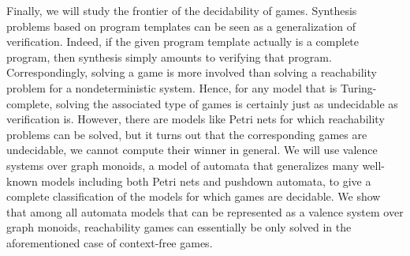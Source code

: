 \documentclass[../../diss.tex]{subfiles}
\begin{document}
Finally, we will study the frontier of the decidability of games.
Synthesis problems based on program templates can be seen as a generalization of verification.
Indeed, if the given program template actually is a complete program, then synthesis simply amounts to verifying that program.
Correspondingly, solving a game is more involved than solving \eg a reachability problem for a nondeterministic system.
Hence, for any model that is Turing-complete, solving the associated type of games is certainly just as undecidable as verification is.
However, there are models like Petri nets for which reachability problems can be solved, but it turns out that the corresponding games are undecidable, \ie we cannot compute their winner in general.
We will use valence systems over graph monoids, a model of automata that generalizes many well-known models including both Petri nets and pushdown automata, to give a complete classification of the models for which games are decidable.
We show that among all automata models that can be represented as a valence system over graph monoids, reachability games can essentially be only solved in the aforementioned case of context-free games.
\end{document}
